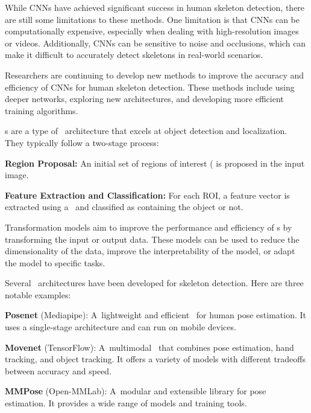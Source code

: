 
While CNNs have achieved significant success in human skeleton detection, there are still some limitations to these methods. One limitation is that CNNs can be computationally expensive, especially when dealing with high-resolution images or videos. Additionally, CNNs can be sensitive to noise and occlusions, which can make it difficult to accurately detect skeletons in real-world scenarios.

Researchers are continuing to develop new methods to improve the accuracy and efficiency of CNNs for human skeleton detection. These methods include using deeper networks, exploring new architectures, and developing more efficient training algorithms.

\RCNN\-s  are a type of \NN\ architecture that excels at object detection and localization. They typically follow a two-stage process:

\startitemize[1]
    \item {\bf Region Proposal:} An initial set of regions of interest  (\ROI\) is proposed in the input image.
    \item {\bf Feature Extraction and Classification:} For each ROI, a feature vector is extracted using a \CNN\ and classified as containing the object or not.
\stopitemize

Transformation models aim to improve the performance and efficiency of \NN\-s by transforming the input or output data. These models can be used to reduce the dimensionality of the data, improve the interpretability of the model, or adapt the model to specific tasks.

Several \NN\ architectures have been developed for skeleton detection. Here are three notable examples:

\startitemize[n]
    \item {\bf Posenet} (Mediapipe): A~lightweight and efficient \NN\ for human pose estimation. It uses a single-stage architecture and can run on mobile devices.
    \item {\bf Movenet} (TensorFlow): A~multimodal \NN\ that combines pose estimation, hand tracking, and object tracking. It offers a variety of models with different tradeoffs between accuracy and speed.
    \item {\bf MMPose} (Open-MMLab): A~modular and extensible library for pose estimation. It provides a wide range of models and training tools.
\stopitemize

